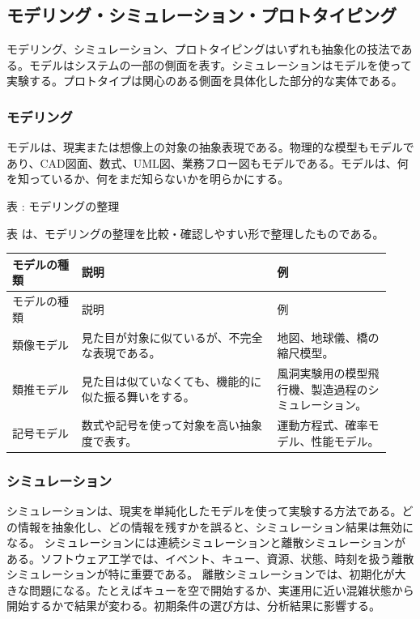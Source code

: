 \subsection{モデリング・シミュレーション・プロトタイピング}
モデリング、シミュレーション、プロトタイピングはいずれも抽象化の技法である。モデルはシステムの一部の側面を表す。シミュレーションはモデルを使って実験する。プロトタイプは関心のある側面を具体化した部分的な実体である。
\subsubsection{モデリング}
モデルは、現実または想像上の対象の抽象表現である。物理的な模型もモデルであり、CAD図面、数式、UML図、業務フロー図もモデルである。モデルは、何を知っているか、何をまだ知らないかを明らかにする。
\par\smallskip\noindent{}\label{tab:ch18-08}表 \thetable: モデリングの整理\par\smallskip
表 \thetable は、モデリングの整理を比較・確認しやすい形で整理したものである。\par\smallskip
\begin{longtable}{>{\raggedright\arraybackslash}p{0.17\linewidth}>{\raggedright\arraybackslash}p{0.48\linewidth}>{\raggedright\arraybackslash}p{0.28\linewidth}}
\toprule
モデルの種類 & 説明 & 例 \\
\midrule
\endfirsthead
\toprule
モデルの種類 & 説明 & 例 \\
\midrule
\endhead
類像モデル & 見た目が対象に似ているが、不完全な表現である。 & 地図、地球儀、橋の縮尺模型。 \\
類推モデル & 見た目は似ていなくても、機能的に似た振る舞いをする。 & 風洞実験用の模型飛行機、製造過程のシミュレーション。 \\
記号モデル & 数式や記号を使って対象を高い抽象度で表す。 & 運動方程式、確率モデル、性能モデル。 \\
\bottomrule
\end{longtable}
\subsubsection{シミュレーション}
シミュレーションは、現実を単純化したモデルを使って実験する方法である。どの情報を抽象化し、どの情報を残すかを誤ると、シミュレーション結果は無効になる。
シミュレーションには連続シミュレーションと離散シミュレーションがある。ソフトウェア工学では、イベント、キュー、資源、状態、時刻を扱う離散シミュレーションが特に重要である。
離散シミュレーションでは、初期化が大きな問題になる。たとえばキューを空で開始するか、実運用に近い混雑状態から開始するかで結果が変わる。初期条件の選び方は、分析結果に影響する。
